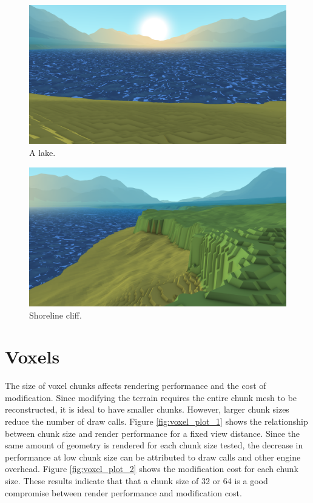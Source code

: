 \begin{figure}
	\centering
		\includegraphics[width=1.0\textwidth]{figures/Screenshot000005.png}
	\caption{A lake.}
	\label{fig:screenshot05}
\end{figure}

\begin{figure}
	\centering
		\includegraphics[width=1.0\textwidth]{figures/Screenshot000006.png}
	\caption{Shoreline cliff.}
	\label{fig:screenshot06}
\end{figure}

\section{Voxels}

The size of voxel chunks affects rendering performance and the cost of modification.
Since modifying the terrain requires the entire chunk mesh to be reconstructed, it is ideal to have smaller chunks.
However, larger chunk sizes reduce the number of draw calls.
Figure \ref{fig:voxel_plot_1} shows the relationship between chunk size and render performance for a fixed view distance.
Since the same amount of geometry is rendered for each chunk size tested, the decrease in performance at low chunk size can be attributed to draw calls and other engine overhead.
Figure \ref{fig:voxel_plot_2} shows the modification cost for each chunk size.
These results indicate that that a chunk size of 32 or 64 is a good compromise between render performance and modification cost.

